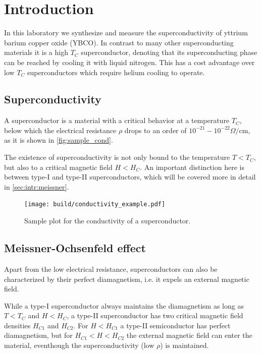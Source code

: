 \section{Introduction}
\label{sec:introduction}
In this laboratory we synthesize and measure the superconductivity of yttrium barium copper oxide
(YBCO). In contrast to many other superconducting materials it is a high $T_C$
superconductor, denoting that its superconducting phase can be reached by cooling it with liquid
nitrogen. This has a cost advantage over low $T_C$ superconductors which require helium cooling to
operate.

\subsection{Superconductivity}
\label{sec:Superconductivity}
A superconductor is a material with a critical behavior at a temperature $T_C$, below which the
electrical resistance $\rho$ drops to an order of $10^{-21} - 10^{-22} \Omega / \text{cm}$, as it is shown
in \autoref{fig:sample_cond}. 

The existence of superconductivity is not only bound to the temperature $T<T_C$, but also to a
critical magnetic field $H < H_C$. An important distinction here is between type-I and type-II
superconductors, which will be covered more in detail in \autoref{sec:intr:meissner}.

\begin{figure}
  \centering
  \texttt{[image: build/conductivity\_example.pdf]}
  \caption{Sample plot for the conductivity of a superconductor.}
  \label{fig:sample_cond}
\end{figure}

\subsection{Meissner-Ochsenfeld effect}
\label{sec:intr:meissner}
Apart from the low electrical resistance, superconductors can also be characterized by their perfect
diamagnetism, i.e. it expels an external magnetic field. 

While a type-I superconductor always maintains the diamagnetism as long as $T < T_C$ and $H < H_C$, a type-II
superconductor has two critical magnetic field densities $H_{C1}$ and $H_{C2}$. For $H < H_{C1}$ a
type-II semiconductor has perfect diamagnetism, but for $H_{C1} < H < H_{C2}$ the external magnetic
field can enter the material, eventhough the superconductivity (low $\rho$) is
maintained.

